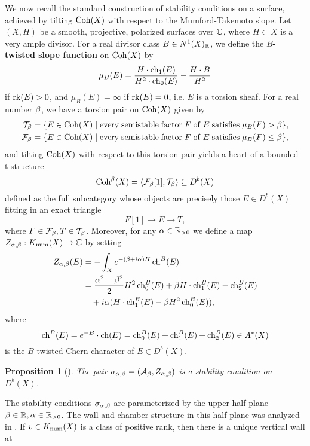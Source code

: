 \documentclass[letterpaper,12pt]{amsart}
\newtheorem{prop}[thm]{Proposition}
\theoremstyle{remark}
\begin{document}
We now recall the standard construction of stability conditions on a surface, achieved by tilting $\mathrm{Coh}(X)$ with respect to the Mumford-Takemoto slope. Let $(X, H)$ be a smooth, projective, polarized surfaces over $\mathbb{C}$, where $H \subset X$ is a very ample divisor. For a real divisor class $B \in N^1(X)_{\mathbb{R}}$, we define the {\bf $B$-twisted slope function} on $\mathrm{Coh}(X)$ by
\[ \mu_B(E) = \frac{H \cdot \operatorname{\mathrm{ch}}_1(E)}{H^2 \cdot \operatorname{\mathrm{ch}}_0(E)} - \frac{H \cdot B}{H^2} \]
if $\operatorname{\mathrm{rk}}(E) > 0$, and $\mu_B(E) = \infty$ if $\operatorname{\mathrm{rk}}(E) = 0$, i.e. $E$ is a torsion sheaf. For a real number $\beta$, we have a torsion pair on $\mathrm{Coh}(X)$ given by
\begin{align*}
    \mathcal{T}_\beta & = \{ E \in \mathrm{Coh}(X) \;|\; \mathrm{every\;semistable\;factor\;} F \mathrm{\;of\;} E \mathrm{\;satisfies\;} \mu_B(F) > \beta\}, \\
    \mathcal{F}_\beta & = \{ E \in \mathrm{Coh}(X) \;|\; \mathrm{every\;semistable\;factor\;} F \mathrm{\;of\;} E \mathrm{\;satisfies\;} \mu_B(F) \le \beta\},
\end{align*}
and tilting $\mathrm{Coh}(X)$ with respect to this torsion pair yields a heart of a bounded t-structure 
\[ \mathrm{Coh}^\beta(X) = \langle \mathcal{F}_\beta[1], \mathcal{T}_\beta \rangle \subseteq D^b(X) \] 
defined as the full subcategory whose objects are precisely those $E \in D^b(X)$ fitting in an exact triangle
\begin{equation}\label{FETtriangle}
    F[1] \to E \to T, 
\end{equation}
where $F \in \mathcal{F}_\beta, T \in \mathcal{T}_\beta$. Moreover, for any $\alpha \in \mathbb{R}_{>0}$ we define a map $Z_{\alpha,\beta}: K_{\mathrm{num}}(X) \to \mathbb{C}$ by setting
\begin{align*}
    Z_{\alpha, \beta}(E) & = -\int_X e^{-(\beta + i \alpha)H} \operatorname{\mathrm{ch}}^B(E) \\
    & = \frac{\alpha^2 - \beta^2}{2} H^2 \operatorname{\mathrm{ch}}^B_0(E) + \beta H\cdot\operatorname{\mathrm{ch}}^B_1(E) - \operatorname{\mathrm{ch}}^B_2(E) \\
    & \quad  + i\alpha(H \cdot \operatorname{\mathrm{ch}}^B_1(E) - \beta H^2 \operatorname{\mathrm{ch}}^B_0(E)),
\end{align*}
where
\[ \operatorname{\mathrm{ch}}^B(E) = e^{-B}\cdot \operatorname{\mathrm{ch}}(E) = \operatorname{\mathrm{ch}}_0^B(E) + \operatorname{\mathrm{ch}}_1^B(E) + \operatorname{\mathrm{ch}}_2^B(E) \in A^*(X) \]
is the $B$-twisted Chern character of $E \in D^b(X)$.
\begin{prop}[{\cite[Corollary 2.1]{ABL13}}]
    The pair $\sigma_{\alpha,\beta} = (\mathcal{A}_\beta, Z_{\alpha,\beta})$ is a stability condition on $D^b(X)$.
\end{prop}
The stability conditions $\sigma_{\alpha,\beta}$ are parameterized by the upper half plane $\beta \in \mathbb{R}, \alpha \in \mathbb{R}_{>0}$. The wall-and-chamber structure in this half-plane was analyzed in \cite{maciocia}. If $v \in K_{\mathrm{num}}(X)$ is a class of positive rank, then there is a unique vertical wall at 
\end{document}

